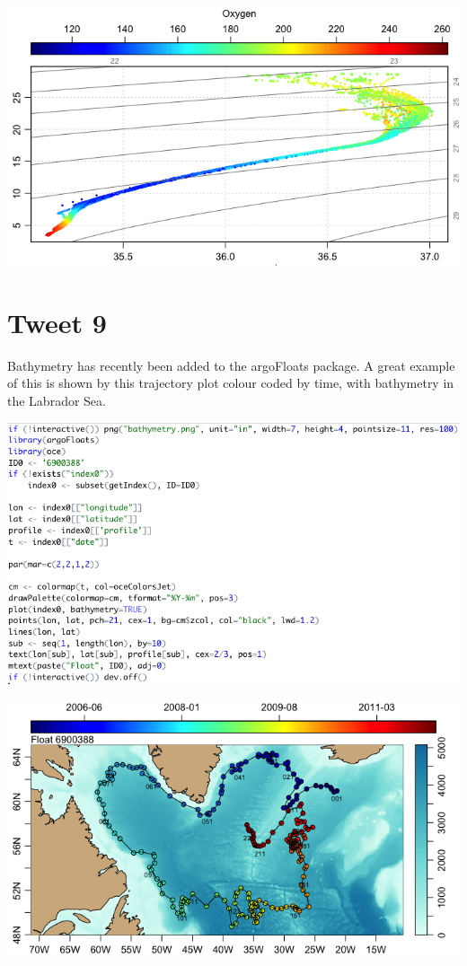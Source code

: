 \documentclass[
]{article}
\begin{document}
\includegraphics{../18_tweets/TSoxygen.png}

\hypertarget{tweet-9}{%
\section{Tweet 9}\label{tweet-9}}

Bathymetry has recently been added to the argoFloats package. A great
example of this is shown by this trajectory plot colour coded by time,
with bathymetry in the Labrador Sea.

\includegraphics{../18_tweets/bathymetryCode.png}

\includegraphics{../18_tweets/bathymetry.png}
\end{document}
